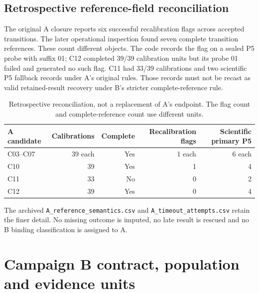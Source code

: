 \documentclass[11pt,a4paper]{article}
\begin{document}
\subsection{Retrospective reference-field reconciliation}
The original A closure reports six successful recalibration flags across accepted transitions. The later operational inspection found seven complete transition references. These count different objects. The code records the flag on a sealed P5 probe with suffix 01; C12 completed 39/39 calibration units but its probe 01 failed and generated no such flag. C11 had 33/39 calibrations and two scientific P5 fallback records under A's original rules. Those records must not be recast as valid retained-result recovery under B's stricter complete-reference rule.

\begin{table}[htbp]\centering\small
\begin{tabular}{lrrrr}\toprule
A candidate & Calibrations & Complete & Recalibration flags & Scientific primary P5\\\midrule
C03--C07 & 39 each & Yes & 1 each & 6 each\\
C10 & 39 & Yes & 1 & 4\\
C11 & 33 & No & 0 & 2\\
C12 & 39 & Yes & 0 & 4\\\bottomrule
\end{tabular}
\caption{Retrospective reconciliation, not a replacement of A's endpoint. The flag count and complete-reference count use different units.}\label{tab:a_reference}
\end{table}
The archived \texttt{A\_reference\_semantics.csv} and \texttt{A\_timeout\_attempts.csv} retain the finer detail. No missing outcome is imputed, no late result is rescued and no B binding classification is assigned to A.

\section{Campaign B contract, population and evidence units}
\end{document}
